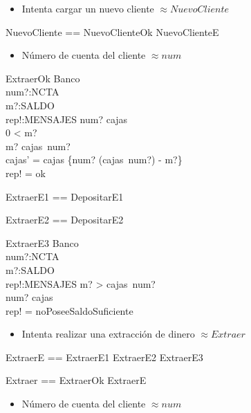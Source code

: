 \begin{itemize}
  \item Intenta cargar un nuevo cliente $\approx NuevoCliente$ 
\end{itemize}

\begin{zed}
NuevoCliente == NuevoClienteOk \lor NuevoClienteE
\end{zed}

\begin{itemize}
  \item Número de cuenta del cliente $\approx num$ 
\end{itemize}

\begin{schema}{ExtraerOk}
\Delta Banco \\
num?:NCTA \\
m?:SALDO \\
rep!:MENSAJES
\where
num? \in \dom cajas \\
0 < m? \\
m? \leq cajas~num? \\
cajas' = cajas \oplus \{num? \mapsto (cajas~num?) - m?\} \\
rep! = ok
\end{schema}

\begin{zed}
ExtraerE1 == DepositarE1 \also

ExtraerE2 == DepositarE2
\end{zed}

\begin{schema}{ExtraerE3}
\Xi Banco \\
num?:NCTA \\
m?:SALDO \\
rep!:MENSAJES
\where
m? > cajas~num? \\
num? \in \dom cajas \\
rep! = noPoseeSaldoSuficiente
\end{schema}

\begin{itemize}
  \item Intenta realizar una extracción de dinero $\approx Extraer$ 
\end{itemize}

\begin{zed}
ExtraerE == ExtraerE1 \lor ExtraerE2 \lor ExtraerE3 \also

Extraer == ExtraerOk \lor ExtraerE
\end{zed}

\begin{itemize}
  \item Número de cuenta del cliente $\approx num$ 
\end{itemize}


